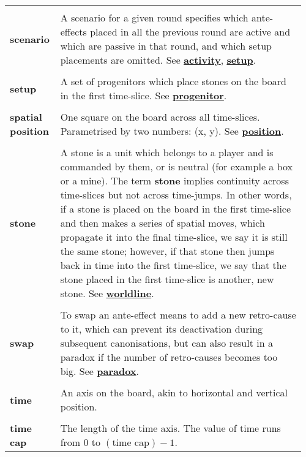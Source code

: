 {\begin{longtable}{ R{0.15\linewidth}  L{0.81\linewidth}  }
 \\* \textbf{scenario} & \parbox[t]{\linewidth}{A scenario for a given round specifies which ante-effects placed in all the previous round are active and which are passive in that round, and which setup placements are omitted. See \hyperref[glossary:activity]{\textbf{activity}}, \hyperref[glossary:setup]{\textbf{setup}}.}\\
 \\* \textbf{setup} & \parbox[t]{\linewidth}{A set of progenitors which place stones on the board in the first time-slice. See \hyperref[glossary:progenitor]{\textbf{progenitor}}.}\\
 \\* \textbf{spatial position} & \parbox[t]{\linewidth}{One square on the board across all time-slices. Parametrised by two numbers: (x, y). See \hyperref[glossary:position]{\textbf{position}}.}\\
 \\* \textbf{stone} & \parbox[t]{\linewidth}{A stone is a unit which belongs to a player and is commanded by them, or is neutral (for example a box or a mine). The term \textbf{stone} implies continuity across time-slices but not across time-jumps. In other words, if a stone is placed on the board in the first time-slice and then makes a series of spatial moves, which propagate it into the final time-slice, we say it is still the same stone; however, if that stone then jumps back in time into the first time-slice, we say that the stone placed in the first time-slice is another, new stone. See \hyperref[glossary:worldline]{\textbf{worldline}}.}\\
 \\* \textbf{swap} & \parbox[t]{\linewidth}{To swap an ante-effect means to add a new retro-cause to it, which can prevent its deactivation during subsequent canonisations, but can also result in a paradox if the number of retro-causes becomes too big. See \hyperref[glossary:paradox]{\textbf{paradox}}.}\\
 \\* \textbf{time} & \parbox[t]{\linewidth}{An axis on the board, akin to horizontal and vertical position.}\\
 \\* \textbf{time cap} & \parbox[t]{\linewidth}{The length of the time axis. The value of time runs from $0$ to $(\text{time cap}) - 1$.}\\

\end{longtable}}

